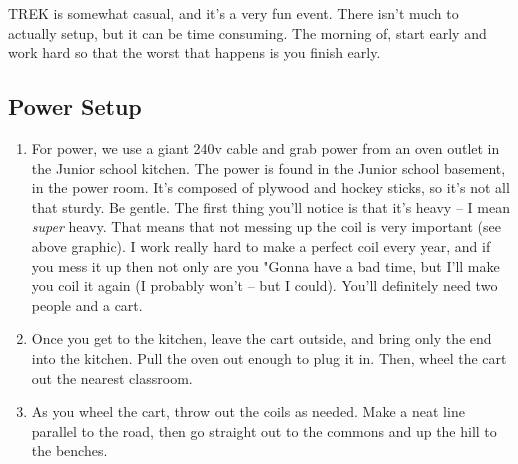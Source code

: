 \documentclass[letterpaper,10pt,oneside,headsepline]{scrreprt}
\begin{document}

TREK is somewhat casual, and it's a very fun event. There isn't much to actually setup, but it can be time consuming. The morning of, start early and work hard so that the worst that happens is you finish early. 

\subsection{Power Setup}
\begin{enumerate}
\item For power, we use a giant 240v cable and grab power from an oven outlet in the Junior school kitchen. The power is found in the Junior school basement, in the power room. It's composed of plywood and hockey sticks, so it's not all that sturdy. Be gentle. The first thing you'll notice is that it's heavy -- I mean \textit{super} heavy. That means that not messing up the coil is very important (see above graphic). I work really hard to make a perfect coil every year, and if you mess it up then not only are you "Gonna have a bad time,  but I'll make you coil it again (I probably won't -- but I could). You'll definitely need two people and a cart. 
\item Once you get to the kitchen, leave the cart outside, and bring only the end into the kitchen. Pull the oven out enough to plug it in. Then, wheel the cart out the nearest classroom.
\item As you wheel the cart, throw out the coils as needed. Make a neat line parallel to the road, then go straight out to the commons and up the hill to the benches.
\end{enumerate}
\end{document}

